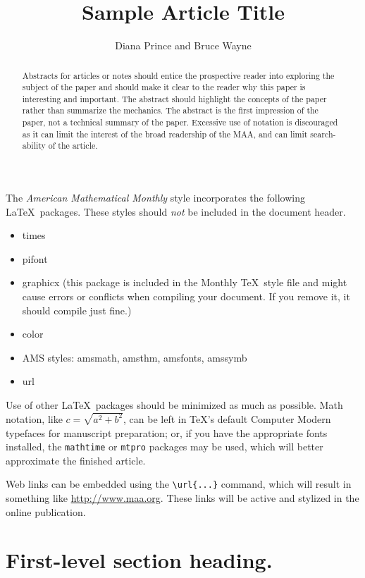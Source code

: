 \documentclass{article}
\theoremstyle{theorem}
\theoremstyle{definition}
\begin{document}
\title{Sample Article Title}
\author{Diana Prince and Bruce Wayne}

\maketitle

\begin{abstract}
Abstracts for articles or notes should entice the prospective reader into exploring the subject of the paper and should make it clear to the reader why this paper is interesting and important.  The abstract should highlight the concepts of the paper rather than summarize the mechanics.  The abstract is the first impression of the paper, not a technical summary of the paper. Excessive use of notation is discouraged as it can limit the interest of the broad readership of the MAA, and can limit search-ability of the article.
\end{abstract}


\noindent
The \textit{American Mathematical Monthly} style incorporates the following \LaTeX\ packages.  These styles should \textit{not} be included in the document header.
\begin{itemize}
\item times
\item pifont
\item graphicx (this package is included in the {\sc Monthly} \TeX\ style file and might cause errors or conflicts when compiling your document.  If you remove it, it should compile just fine.)
\item color
\item AMS styles: amsmath, amsthm, amsfonts, amssymb
\item url
\end{itemize}
Use of other \LaTeX\ packages should be minimized as much as possible. Math notation, like $c = \sqrt{a^2 +b^2}$, can be left in \TeX's default Computer Modern typefaces for manuscript preparation; or, if you have the appropriate fonts installed, the \texttt{mathtime} or \texttt{mtpro} packages may be used, which will better approximate the finished article.

Web links can be embedded using the \verb~\url{...}~ command, which will result in something like \url{http://www.maa.org}.  These links will be active and stylized in the online publication.

\section{First-level section heading.}
\end{document}
